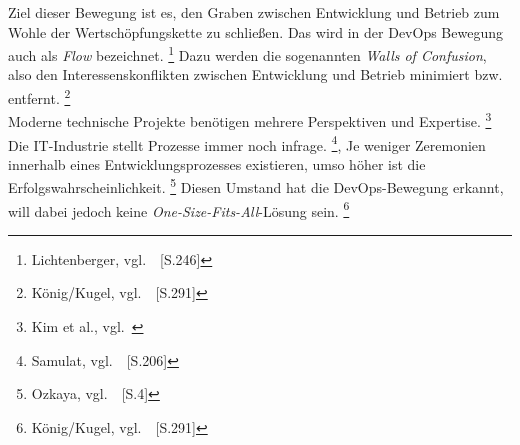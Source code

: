 Ziel dieser Bewegung ist es, den Graben zwischen Entwicklung und Betrieb zum Wohle der Wertschöpfungskette zu schließen.
Das wird in der DevOps Bewegung auch als \textsl{Flow} bezeichnet. \footnote{Lichtenberger, vgl.~\cite{Lichtenberger2017}~[S.246]}
Dazu werden die sogenannten \textsl{Walls of Confusion}, also den Interessenskonflikten zwischen Entwicklung und Betrieb minimiert bzw. entfernt. \footnote{König/Kugel, vgl.~\cite{Konig2019}~[S.291]} \\

Moderne technische Projekte benötigen mehrere Perspektiven und Expertise. \footnote{Kim et al., vgl.~\cite{Kim2018}}
Die IT-Industrie stellt Prozesse immer noch infrage. \footnote{Samulat, vgl.~\cite{Samulat2017}~[S.206]},
Je weniger Zeremonien innerhalb eines Entwicklungsprozesses existieren, umso höher ist die Erfolgswahrscheinlichkeit. \footnote{Ozkaya, vgl.~\cite{Ozkaya2019}~[S.4]}
Diesen Umstand hat die DevOps-Bewegung erkannt, will dabei jedoch keine \textsl{One-Size-Fits-All}-Lösung sein. \footnote{König/Kugel, vgl.~\cite{Konig2019}~[S.291]}

